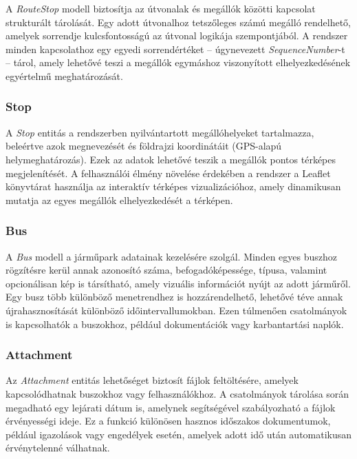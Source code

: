 A \textit{RouteStop} modell biztosítja az útvonalak és megállók közötti kapcsolat strukturált tárolását. Egy adott útvonalhoz tetszőleges számú megálló rendelhető, amelyek sorrendje kulcsfontosságú az útvonal logikája szempontjából. A rendszer minden kapcsolathoz egy egyedi sorrendértéket – úgynevezett \textit{SequenceNumber}-t – tárol, amely lehetővé teszi a megállók egymáshoz viszonyított elhelyezkedésének egyértelmű meghatározását.

\subsubsection{Stop}

A \textit{Stop} entitás a rendszerben nyilvántartott megállóhelyeket tartalmazza, beleértve azok megnevezését és földrajzi koordinátáit (GPS-alapú helymeghatározás). Ezek az adatok lehetővé teszik a megállók pontos térképes megjelenítését. A felhasználói élmény növelése érdekében a rendszer a Leaflet könyvtárat használja az interaktív térképes vizualizációhoz, amely dinamikusan mutatja az egyes megállók elhelyezkedését a térképen.

\subsubsection{Bus}

A \textit{Bus} modell a járműpark adatainak kezelésére szolgál. Minden egyes buszhoz rögzítésre kerül annak azonosító száma, befogadóképessége, típusa, valamint opcionálisan kép is társítható, amely vizuális információt nyújt az adott járműről. Egy busz több különböző menetrendhez is hozzárendelhető, lehetővé téve annak újrahasznosítását különböző időintervallumokban. Ezen túlmenően csatolmányok is kapcsolhatók a buszokhoz, például dokumentációk vagy karbantartási naplók.

\subsubsection{Attachment}

Az \textit{Attachment} entitás lehetőséget biztosít fájlok feltöltésére, amelyek kapcsolódhatnak buszokhoz vagy felhasználókhoz. A csatolmányok tárolása során megadható egy lejárati dátum is, amelynek segítségével szabályozható a fájlok érvényességi ideje. Ez a funkció különösen hasznos időszakos dokumentumok, például igazolások vagy engedélyek esetén, amelyek adott idő után automatikusan érvénytelenné válhatnak.

